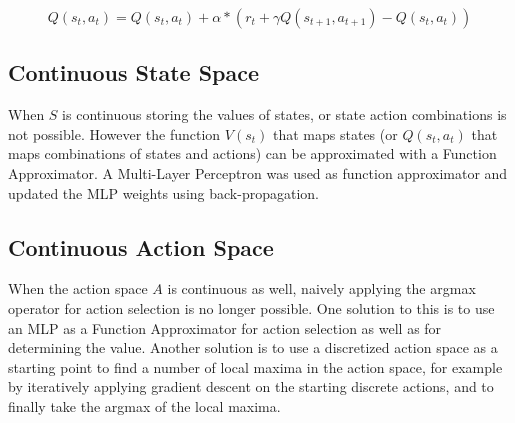 \begin{equation}
\label{eq:upd_q}
Q(s_t,a_t) = Q(s_t,a_t) + \alpha*(r_t + \gamma Q(s_{t+1},a_{t+1}) - Q(s_t, a_t))
\end{equation}

\subsection{Continuous State Space}

When $S$ is continuous storing the values of states, or state action combinations is not possible. However the function $V(s_t)$ that maps states (or $Q(s_t,a_t)$ that maps combinations of states and actions) can be approximated with a Function Approximator. A Multi-Layer Perceptron was used as function approximator and updated the MLP weights using back-propagation.

\subsection{Continuous Action Space}

When the action space $A$ is continuous as well, naively applying the argmax operator for action selection is no longer possible. One solution to this is to use an MLP as a Function Approximator for action selection as well as for determining the value. Another solution is to use a discretized action space as a starting point to find a number of local maxima in the action space, for example by iteratively applying gradient descent on the starting discrete actions, and to finally take the argmax of the local maxima.

